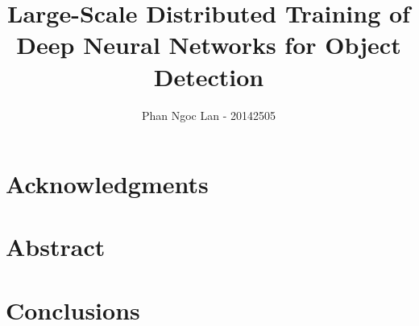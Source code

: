 \documentclass[fontsize=12pt]{scrartcl}
\title{Large-Scale Distributed Training of Deep Neural Networks for Object Detection}
\author{Phan Ngoc Lan - 20142505}
\begin{document}
\maketitle
\pagebreak

\section*{Acknowledgments}

\pagebreak

\section*{Abstract}

\pagebreak

\tableofcontents
\pagebreak



\pagebreak



\section{Conclusions}

\pagebreak


\end{document}
